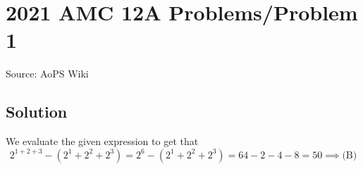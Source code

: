 \documentclass[12pt]{article}
\begin{document}
\section*{{2021 AMC 12A Problems/Problem 1}}
Source: AoPS Wiki

\subsection*{Solution}
We evaluate the given expression to get that \[2^{1+2+3}-(2^1+2^2+2^3)=2^6-(2^1+2^2+2^3)=64-2-4-8=50 \implies \boxed{\text{(B)}}\]
\end{document}
